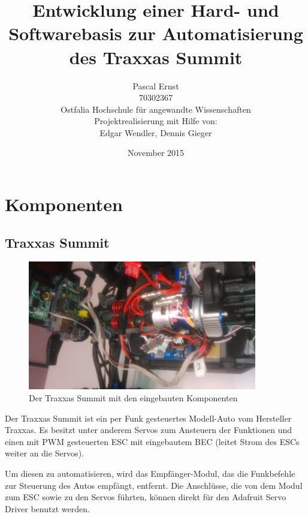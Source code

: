 \documentclass[a4paper,10pt]{scrartcl}
\begin{document}
\title{Entwicklung einer Hard- und Softwarebasis zur Automatisierung des Traxxas Summit}
\author{Pascal Ernst\\
  70302367 \\
  Ostfalia Hochschule für angewandte Wissenschaften \\
  Projektrealisierung mit Hilfe von: \\
  Edgar Wendler, Dennis Gieger}
\date{November 2015}
\maketitle

\newpage

\section{Komponenten}

  \subsection{Traxxas Summit}

    \begin{figure}[ht!]
      \centering
      \includegraphics[width=100mm]{pics/hardware.jpg}
      \caption{Der Traxxas Summit mit den eingebauten Komponenten}
    \end{figure}

    Der Traxxas Summit ist ein per Funk gesteuertes Modell-Auto vom Hersteller
    Traxxas.
    Es besitzt unter anderem Servos zum Ansteuern der Funktionen und einen mit
    PWM gesteuerten ESC mit eingebautem BEC (leitet Strom des ESCs weiter an die
    Servos).

    Um diesen zu automatisieren, wird das Empfänger-Modul, das die Funkbefehle
    zur Steuerung des Autos empfängt, entfernt.
    Die Anschlüsse, die von dem Modul zum ESC sowie zu den Servos führten,
    können direkt für den Adafruit Servo Driver benutzt werden.
\end{document}
